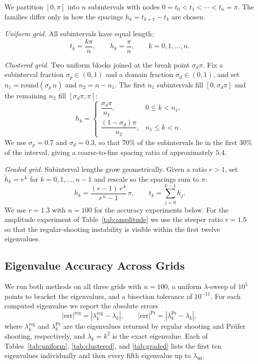 \documentclass[12pt,reqno]{amsart}
\numberwithin{equation}{section}
\begin{document}
We partition $[0,\pi]$ into $n$ subintervals with nodes $0 = t_0 < t_1 < \cdots < t_n = \pi$. The families differ only in how the spacings $h_k = t_{k+1} - t_k$ are chosen.

\emph{Uniform grid.} All subintervals have equal length:
\begin{equation}
  t_k = \frac{k\pi}{n}, \qquad h_k = \frac{\pi}{n}, \qquad k = 0, 1, \dots, n.
\end{equation}

\emph{Clustered grid.} Two uniform blocks joined at the break point $\sigma_d\pi$. Fix a subinterval fraction $\sigma_p \in (0,1)$ and a domain fraction $\sigma_d \in (0,1)$, and set $n_1 = \mathrm{round}(\sigma_p\, n)$ and $n_2 = n - n_1$. The first $n_1$ subintervals fill $[0,\sigma_d\pi]$ and the remaining $n_2$ fill $[\sigma_d\pi,\pi]$:
\begin{equation}
  h_k =
  \begin{cases}
    \dfrac{\sigma_d \pi}{n_1}, & 0 \le k < n_1, \\[8pt]
    \dfrac{(1-\sigma_d)\pi}{n_2}, & n_1 \le k < n.
  \end{cases}
\end{equation}
We use $\sigma_p = 0.7$ and $\sigma_d = 0.3$, so that $70\%$ of the subintervals lie in the first $30\%$ of the interval, giving a coarse-to-fine spacing ratio of approximately $5.4$.

\emph{Graded grid.} Subinterval lengths grow geometrically. Given a ratio $r > 1$, set $\tilde h_k = r^{\,k}$ for $k = 0, 1, \dots, n-1$ and rescale so the spacings sum to $\pi$:
\begin{equation}
  h_k = \frac{(r-1)\,r^{\,k}}{r^{\,n} - 1}\,\pi, \qquad t_k = \sum_{j=0}^{k-1} h_j.
\end{equation}
We use $r = 1.3$ with $n = 100$ for the accuracy experiments below. For the amplitude experiment of Table~\ref{tab:amplitude} we use the steeper ratio $r = 1.5$ so that the regular-shooting instability is visible within the first twelve eigenvalues.

\subsection{Eigenvalue Accuracy Across Grids}
\label{subsec:accuracy}
We run both methods on all three grids with $n = 100$, a uniform $\lambda$-sweep of $10^{5}$ points to bracket the eigenvalues, and a bisection tolerance of $10^{-11}$. For each computed eigenvalue we report the absolute errors
\[
|\text{err}|^{\text{reg}} = |\lambda_k^{\text{reg}} - \lambda_k|, \qquad
|\text{err}|^{\text{Pr}} = |\lambda_k^{\text{Pr}} - \lambda_k|,
\]
where $\lambda_k^{\text{reg}}$ and $\lambda_k^{\text{Pr}}$ are the eigenvalues returned by regular shooting and Pr\"ufer shooting, respectively, and $\lambda_k = k^2$ is the exact eigenvalue. Each of Tables~\ref{tab:uniform}, \ref{tab:clustered}, and \ref{tab:graded} lists the first ten eigenvalues individually and then every fifth eigenvalue up to $\lambda_{60}$.
\end{document}
